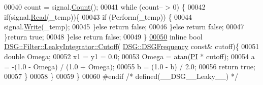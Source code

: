 \begin{DoxyCode}
00040                 count = signal.\hyperlink{class_d_s_g_1_1_ring_buffer_a9bd79b0a6dff618b205e396c101ee070}{Count}();
00041                 \textcolor{keywordflow}{while} (count-- > 0) \{
00042                     \textcolor{keywordflow}{if}(signal.\hyperlink{class_d_s_g_1_1_ring_buffer_a6b2848a64f15c7b0c320779582fa0fbe}{Read}(\_temp))\{
00043                         \textcolor{keywordflow}{if} (Perform(\_temp)) \{
00044                             signal.\hyperlink{class_d_s_g_1_1_ring_buffer_aa5dd2caa0a270173251faee40a43d692}{Write}(\_temp);
00045                         \}\textcolor{keywordflow}{else} \textcolor{keywordflow}{return} \textcolor{keyword}{false};
00046                     \}\textcolor{keywordflow}{else} \textcolor{keywordflow}{return} \textcolor{keyword}{false};
00047                 \}\textcolor{keywordflow}{return} \textcolor{keyword}{true};
00048             \}\textcolor{keywordflow}{else} \textcolor{keywordflow}{return} \textcolor{keyword}{false};
00049         \}
\hypertarget{_leaky_8h_source_l00050}{}\hyperlink{class_d_s_g_1_1_filter_1_1_leaky_integrator_a5f326faae2d72a6550b2e0593b00eea6}{00050}         \textcolor{keyword}{inline} \textcolor{keywordtype}{bool} \hyperlink{class_d_s_g_1_1_filter_1_1_leaky_integrator_a5f326faae2d72a6550b2e0593b00eea6}{DSG::Filter::LeakyIntegrator::Cutoff}(
      \hyperlink{namespace_d_s_g_a4315a061386fa1014fda09b15d3a6973}{DSG::DSGFrequency} \textcolor{keyword}{const}& cutoff)\{
00051             \textcolor{keywordtype}{double} Omega;
00052             x1 = y1 = 0.0;
00053             Omega = atan(\hyperlink{_p_i_8h_a598a3330b3c21701223ee0ca14316eca}{PI} * cutoff);
00054             a = -(1.0 - Omega) / (1.0 + Omega);
00055             b = (1.0 - b) / 2.0;
00056             \textcolor{keywordflow}{return} \textcolor{keyword}{true};
00057         \}
00058     \}
00059 \}
00060 \textcolor{preprocessor}{#endif }\textcolor{comment}{/* defined(\_\_DSG\_\_Leaky\_\_) */}\textcolor{preprocessor}{}
\end{DoxyCode}
